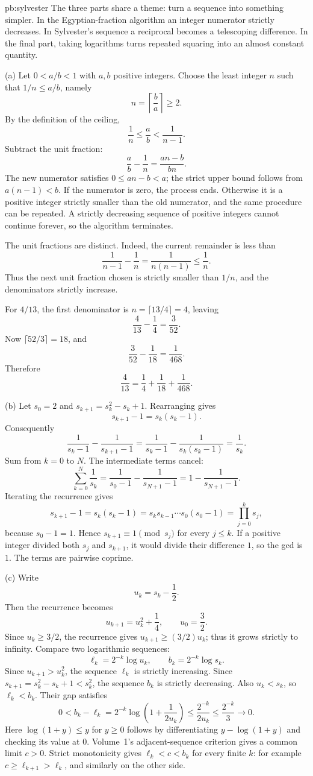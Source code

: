 \begin{solution}{pb:sylvester}
\idea The three parts share a theme: turn a sequence into something simpler. In the Egyptian-fraction algorithm an integer numerator strictly decreases. In Sylvester's sequence a reciprocal becomes a telescoping difference. In the final part, taking logarithms turns repeated squaring into an almost constant quantity.

\writeup (a) Let $0<a/b<1$ with $a,b$ positive integers. Choose the least integer $n$ such that $1/n\le a/b$, namely
\[
n=\left\lceil\frac ba\right\rceil\ge2.
\]
By the definition of the ceiling,
\[
\frac1n\le\frac ab<\frac1{n-1}.
\]
Subtract the unit fraction:
\[
\frac ab-\frac1n=\frac{an-b}{bn}.
\]
The new numerator satisfies $0\le an-b<a$; the strict upper bound follows from $a(n-1)<b$. If the numerator is zero, the process ends. Otherwise it is a positive integer strictly smaller than the old numerator, and the same procedure can be repeated. A strictly decreasing sequence of positive integers cannot continue forever, so the algorithm terminates.

The unit fractions are distinct. Indeed, the current remainder is less than
\[
\frac1{n-1}-\frac1n=\frac1{n(n-1)}\le\frac1n.
\]
Thus the next unit fraction chosen is strictly smaller than $1/n$, and the denominators strictly increase.

For $4/13$, the first denominator is $n=\lceil13/4\rceil=4$, leaving
\[
\frac4{13}-\frac14=\frac3{52}.
\]
Now $\lceil52/3\rceil=18$, and
\[
\frac3{52}-\frac1{18}=\frac1{468}.
\]
Therefore
\[
\boxed{\frac4{13}=\frac14+\frac1{18}+\frac1{468}}.
\]

(b) Let $s_0=2$ and $s_{k+1}=s_k^2-s_k+1$. Rearranging gives
\[
s_{k+1}-1=s_k(s_k-1).
\]
Consequently
\[
\frac1{s_k-1}-\frac1{s_{k+1}-1}
=\frac1{s_k-1}-\frac1{s_k(s_k-1)}
=\frac1{s_k}.
\]
Sum from $k=0$ to $N$. The intermediate terms cancel:
\[
\sum_{k=0}^N\frac1{s_k}
=\frac1{s_0-1}-\frac1{s_{N+1}-1}
=\boxed{1-\frac1{s_{N+1}-1}}.
\]
Iterating the recurrence gives
\[
s_{k+1}-1=s_k(s_k-1)
=s_ks_{k-1}\cdots s_0(s_0-1)
=\prod_{j=0}^ks_j,
\]
because $s_0-1=1$. Hence $s_{k+1}\equiv1\pmod{s_j}$ for every $j\le k$. If a positive integer divided both $s_j$ and $s_{k+1}$, it would divide their difference $1$, so the gcd is $1$. The terms are pairwise coprime.

(c) Write
\[
u_k=s_k-\frac12.
\]
Then the recurrence becomes
\[
u_{k+1}=u_k^2+\frac14,\qquad u_0=\frac32.
\]
Since $u_k\ge3/2$, the recurrence gives $u_{k+1}\ge(3/2)u_k$; thus it grows strictly to infinity. Compare two logarithmic sequences:
\[
\ell_k=2^{-k}\log u_k,\qquad b_k=2^{-k}\log s_k.
\]
Since $u_{k+1}>u_k^2$, the sequence $\ell_k$ is strictly increasing.
Since $s_{k+1}=s_k^2-s_k+1<s_k^2$, the sequence $b_k$ is strictly decreasing.
Also $u_k<s_k$, so $\ell_k<b_k$. Their gap satisfies
\[
0<b_k-\ell_k
=2^{-k}\log\left(1+\frac1{2u_k}\right)
\le\frac{2^{-k}}{2u_k}\le\frac{2^{-k}}3\longrightarrow0.
\]
Here $\log(1+y)\le y$ for $y\ge0$ follows by differentiating
$y-\log(1+y)$ and checking its value at $0$.
Volume~1's adjacent-sequence criterion gives a common limit $c>0$.
Strict monotonicity gives $\ell_k<c<b_k$ for every finite $k$:
for example $c\ge\ell_{k+1}>\ell_k$, and similarly on the other side.


\end{solution}
